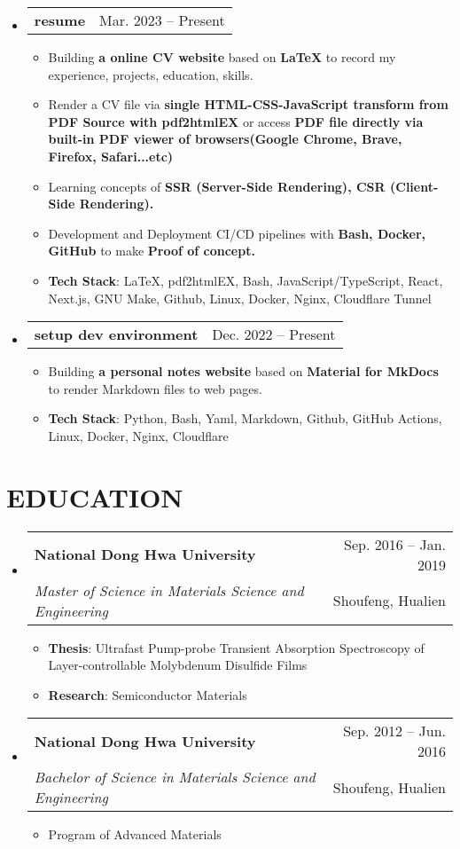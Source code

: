 \documentclass[letterpaper,11pt]{article}
\makeatletter
\newcommand{\resumeItem}[1]{
  \item\small{
    {#1 \vspace{-1pt}}
  }
}
\newcommand{\resumeSubheading}[4]{
  \vspace{-1pt}\item
    \begin{tabular*}{\textwidth}[t]{l@{\extracolsep{\fill}}r}
      \textbf{#1} & {\color{dark-grey}\small #2}\vspace{1pt}\\ %
      \textit{#3} & {\color{dark-grey} \small #4}\\ %
    \end{tabular*}\vspace{-4pt}
}
\newcommand{\resumeProjectHeading}[2]{
    \item
    \begin{tabular*}{\textwidth}{l@{\extracolsep{\fill}}r}
      #1 & {\color{dark-grey} #2} \\  %
    \end{tabular*}\vspace{-4pt}
}
\newcommand{\resumeSubHeadingListStart}{\begin{itemize}[leftmargin=0in, label={}]}
\newcommand{\resumeSubHeadingListEnd}{\end{itemize}}
\newcommand{\resumeItemListStart}{\begin{itemize}}
\newcommand{\resumeItemListEnd}{\end{itemize}\vspace{0pt}}
\makeatother
\begin{document}
    \resumeSubHeadingListStart
    \resumeProjectHeading
        {\textbf{resume}} {Mar. 2023 -- Present}
        \resumeItemListStart
          \resumeItem{Building \textbf{a online CV website} based on \textbf{LaTeX} to record my experience, projects, education, skills.}
          \resumeItem{Render a CV file via \textbf{single HTML-CSS-JavaScript transform from PDF Source with pdf2htmlEX} or access \textbf{PDF file directly via built-in PDF viewer of browsers(Google Chrome, Brave, Firefox, Safari...etc)}}
          \resumeItem{Learning concepts of \textbf{SSR (Server-Side Rendering),  CSR (Client-Side Rendering).}}
          \resumeItem{Development and Deployment CI/CD pipelines with \textbf{Bash, Docker, GitHub} to make \textbf{Proof of concept.}}
          \resumeItem{\textbf{Tech Stack}: LaTeX, pdf2htmlEX, Bash, JavaScript/TypeScript, React, Next.js, GNU Make, Github, Linux, Docker, Nginx, Cloudflare Tunnel}
        \resumeItemListEnd          
    \resumeSubHeadingListEnd

    \resumeSubHeadingListStart
    \resumeProjectHeading
        {\textbf{setup dev environment}} {Dec. 2022 -- Present}
        \resumeItemListStart
          \resumeItem{Building \textbf{a personal notes website} based on \textbf{Material for MkDocs} to render Markdown files to web pages.}
          \resumeItem{\textbf{Tech Stack}: Python, Bash, Yaml, Markdown, Github, GitHub Actions, Linux, Docker, Nginx, Cloudflare}
        \resumeItemListEnd          
    \resumeSubHeadingListEnd

\section {EDUCATION}
\resumeSubHeadingListStart
\resumeSubheading
  {National Dong Hwa University}{Sep. 2016 -- Jan. 2019}
  {Master of Science in Materials Science and Engineering}{Shoufeng, Hualien}
    \resumeItemListStart
  \resumeItem {\textbf{Thesis}: Ultrafast Pump-probe Transient Absorption Spectroscopy of Layer-controllable Molybdenum Disulfide Films}
    \resumeItem 
        {\textbf{Research}: Semiconductor Materials }
    \resumeItemListEnd
\resumeSubHeadingListEnd

\resumeSubHeadingListStart
\resumeSubheading
  {National Dong Hwa University}{Sep. 2012 -- Jun. 2016}
  {Bachelor of Science in Materials Science and Engineering}{Shoufeng, Hualien}
    \resumeItemListStart
    \resumeItem {Program of Advanced Materials}
    \resumeItemListEnd
\resumeSubHeadingListEnd
\end{document}
